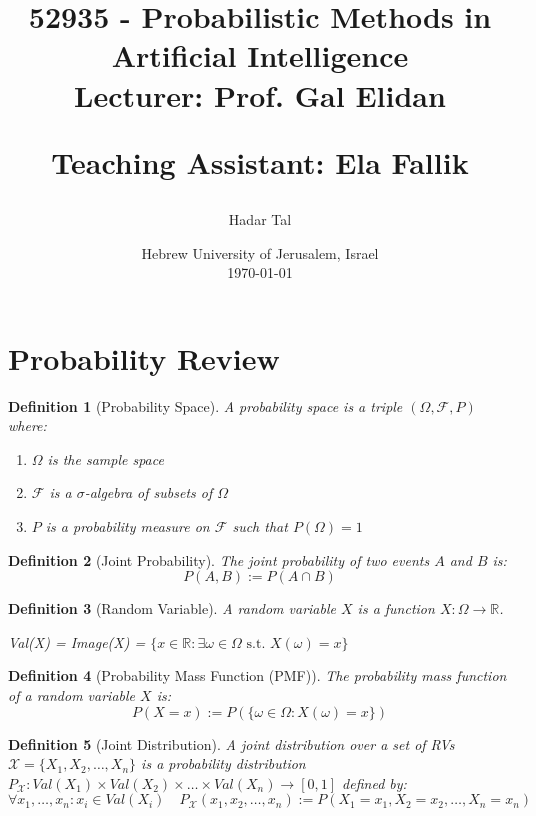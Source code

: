\documentclass[11pt]{article}
\title{
    \huge 52935 - Probabilistic Methods in Artificial Intelligence\\
    \vspace{10pt}
    \Large Lecturer: Prof. Gal Elidan 
    
    Teaching Assistant: Ela Fallik

}
\author{Hadar Tal}
\date{Hebrew University of Jerusalem, Israel\\
    \vspace{10pt}
    \today}
\numberwithin{equation}{section}
\theoremstyle{boldStyle}
\theoremstyle{boldBlueStyle}
\theoremstyle{boldPurpleStyle}
\theoremstyle{boldRedStyle}
\newtheorem{definition}{Definition}[section]
\begin{document}
\maketitle
\tableofcontents

\newpage
\section{Probability Review}

\begin{definition}[Probability Space]
    A probability space is a triple $(\Omega, \mathcal{F}, P)$ where:
    \begin{enumerate}
        \item $\Omega$ is the sample space
        \item $\mathcal{F}$ is a $\sigma$-algebra of subsets of $\Omega$
        \item $P$ is a probability measure on $\mathcal{F}$ such that $P(\Omega) = 1$
    \end{enumerate}
\end{definition}

\begin{definition}[Joint Probability]
    The joint probability of two events $A$ and $B$ is:
    \begin{equation*}
        P(A, B) := P(A \cap B) 
    \end{equation*}
\end{definition}

\begin{definition}[Random Variable]
    A random variable $X$ is a function $X: \Omega \rightarrow \mathbb{R}$. 

    Val(X) = Image(X) = $\{ x \in \mathbb{R} : \exists \omega \in \Omega \text{ s.t. } X(\omega) = x \}$
\end{definition}

\begin{definition}[Probability Mass Function (PMF)]
    The probability mass function of a random variable $X$ is:
    \begin{equation*}
        P(X = x) := P(\{ \omega \in \Omega : X(\omega) = x \})
    \end{equation*}
\end{definition}

\begin{definition}[Joint Distribution]
    A joint distribution over a set of RVs $\mathcal{X} = \{ X_1, X_2, \ldots, X_n \}$ is a probability distribution 
    $P_{\mathcal{X}}: Val(X_1) \times Val(X_2) \times \ldots \times Val(X_n) \rightarrow [0, 1]$ defined by:
    \begin{equation*}
       \forall x_1, \ldots, x_n : x_i \in Val(X_i) \quad
        P_{\mathcal{X}}(x_1, x_2, \ldots, x_n) := P(X_1 = x_1, X_2 = x_2, \ldots, X_n = x_n)
    \end{equation*}
\end{definition}
\end{document}
